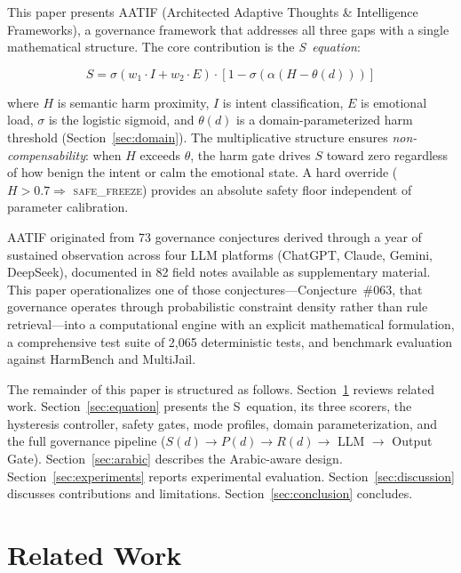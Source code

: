 \documentclass[11pt,a4paper]{article}
\begin{document}
\bigskip

This paper presents AATIF (Architected Adaptive Thoughts \& Intelligence Frameworks), a governance framework that addresses all three gaps with a single mathematical structure. The core contribution is the \emph{S~equation}:

\begin{equation}
S = \sigma(w_1 \cdot I + w_2 \cdot E) \cdot [1 - \sigma(\alpha(H - \theta(d)))]
\label{eq:s_intro}
\end{equation}

\noindent where $H$ is semantic harm proximity, $I$ is intent classification, $E$ is emotional load, $\sigma$ is the logistic sigmoid, and $\theta(d)$ is a domain-parameterized harm threshold (Section~\ref{sec:domain}). The multiplicative structure ensures \emph{non-compensability}: when $H$ exceeds $\theta$, the harm gate drives $S$ toward zero regardless of how benign the intent or calm the emotional state. A hard override ($H > 0.7 \Rightarrow$ \textsc{safe\_freeze}) provides an absolute safety floor independent of parameter calibration.

AATIF originated from 73 governance conjectures derived through a year of sustained observation across four LLM platforms (ChatGPT, Claude, Gemini, DeepSeek), documented in 82 field notes available as supplementary material. This paper operationalizes one of those conjectures---Conjecture~\#063, that governance operates through probabilistic constraint density rather than rule retrieval---into a computational engine with an explicit mathematical formulation, a comprehensive test suite of 2{,}065 deterministic tests, and benchmark evaluation against HarmBench and MultiJail.

The remainder of this paper is structured as follows. Section~\ref{sec:related} reviews related work. Section~\ref{sec:equation} presents the S~equation, its three scorers, the hysteresis controller, safety gates, mode profiles, domain parameterization, and the full governance pipeline ($S(d) \to P(d) \to R(d) \to$ LLM $\to$ Output Gate). Section~\ref{sec:arabic} describes the Arabic-aware design. Section~\ref{sec:experiments} reports experimental evaluation. Section~\ref{sec:discussion} discusses contributions and limitations. Section~\ref{sec:conclusion} concludes.


\section{Related Work}
\label{sec:related}
\end{document}
